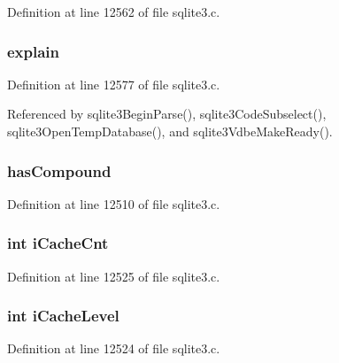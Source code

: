 Definition at line 12562 of file sqlite3.\+c.

\hypertarget{struct_parse_a2b62234e0234e2065724146f00c574cd}{}
\subsubsection[{explain}]{ explain}\label{struct_parse_a2b62234e0234e2065724146f00c574cd}


Definition at line 12577 of file sqlite3.\+c.



Referenced by sqlite3\+Begin\+Parse(), sqlite3\+Code\+Subselect(), sqlite3\+Open\+Temp\+Database(), and sqlite3\+Vdbe\+Make\+Ready().

\hypertarget{struct_parse_ab0fc7b7138dbafcc6c38a0676d12109f}{}
\subsubsection[{has\+Compound}]{ has\+Compound}\label{struct_parse_ab0fc7b7138dbafcc6c38a0676d12109f}


Definition at line 12510 of file sqlite3.\+c.

\hypertarget{struct_parse_a0336978d6835b35b995c8e5d9420617a}{}
\subsubsection[{i\+Cache\+Cnt}]{\setlength{\rightskip}{0pt plus 5cm}int i\+Cache\+Cnt}\label{struct_parse_a0336978d6835b35b995c8e5d9420617a}


Definition at line 12525 of file sqlite3.\+c.

\hypertarget{struct_parse_a267ccb9cdda746f8e4ac595057806893}{}
\subsubsection[{i\+Cache\+Level}]{\setlength{\rightskip}{0pt plus 5cm}int i\+Cache\+Level}\label{struct_parse_a267ccb9cdda746f8e4ac595057806893}


Definition at line 12524 of file sqlite3.\+c.



